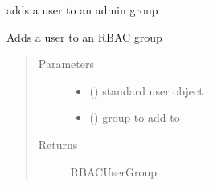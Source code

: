\documentclass[letterpaper,10pt,english]{sphinxmanual}
\begin{document}

\begin{fulllineitems}
\label{\detokenize{rbac:rbac.core.rbac_add_user_to_admin_group}}
adds a user to an admin group

\end{fulllineitems}


\begin{fulllineitems}
\label{\detokenize{rbac:rbac.core.rbac_add_user_to_group}}
Adds a user to an RBAC group
\begin{quote}\begin{description}
\item[{Parameters}] \leavevmode\begin{itemize}
\item {} 
 ({\hyperref[\detokenize{accounts:accounts.models.User}]{}}) \textendash{} standard user object

\item {} 
 ({\hyperref[\detokenize{rbac:rbac.models.RBACGroup}]{}}) \textendash{} group to add to

\end{itemize}

\item[{Returns}] \leavevmode
RBACUserGroup

\end{description}\end{quote}

\end{fulllineitems}

\end{document}

